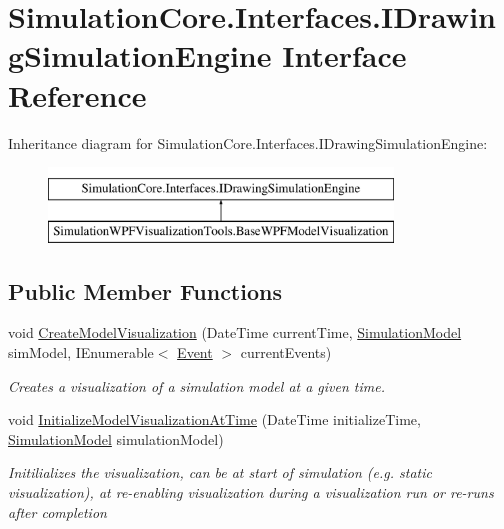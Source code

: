 \hypertarget{interface_simulation_core_1_1_interfaces_1_1_i_drawing_simulation_engine}{}\section{Simulation\+Core.\+Interfaces.\+I\+Drawing\+Simulation\+Engine Interface Reference}
\label{interface_simulation_core_1_1_interfaces_1_1_i_drawing_simulation_engine}
Inheritance diagram for Simulation\+Core.\+Interfaces.\+I\+Drawing\+Simulation\+Engine\+:\begin{figure}[H]
\begin{center}
\leavevmode
\includegraphics[height=2.000000cm]{interface_simulation_core_1_1_interfaces_1_1_i_drawing_simulation_engine}
\end{center}
\end{figure}
\subsection*{Public Member Functions}
\begin{DoxyCompactItemize}
\item 
void \hyperlink{interface_simulation_core_1_1_interfaces_1_1_i_drawing_simulation_engine_aa9d0cc45b892f50bfe3913d692cd4a78}{Create\+Model\+Visualization} (Date\+Time current\+Time, \hyperlink{class_simulation_core_1_1_simulation_classes_1_1_simulation_model}{Simulation\+Model} sim\+Model, I\+Enumerable$<$ \hyperlink{class_simulation_core_1_1_h_c_c_m_elements_1_1_event}{Event} $>$ current\+Events)
\begin{DoxyCompactList}\small\item\em Creates a visualization of a simulation model at a given time. \end{DoxyCompactList}\item 
void \hyperlink{interface_simulation_core_1_1_interfaces_1_1_i_drawing_simulation_engine_a9cd622bd39311b9a7ba3479f348371dd}{Initialize\+Model\+Visualization\+At\+Time} (Date\+Time initialize\+Time, \hyperlink{class_simulation_core_1_1_simulation_classes_1_1_simulation_model}{Simulation\+Model} simulation\+Model)
\begin{DoxyCompactList}\small\item\em Initilializes the visualization, can be at start of simulation (e.\+g. static visualization), at re-\/enabling visualization during a visualization run or re-\/runs after completion \end{DoxyCompactList}\end{DoxyCompactItemize}


